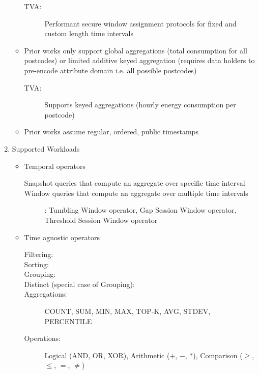 \documentclass{article}
\begin{document}
\begin{enumerate}
\begin{itemize}
        \begin{description}
            \item[TVA:] Performant secure window assignment protocols for fixed and custom length time intervals
        \end{description}
       \item Prior works only support global aggregations (total consumption for all postcodes) or limited additive keyed aggregation (requires data holders to pre-encode attribute domain i.e. all possible postcodes)
         \begin{description}
            \item[TVA:] Supports keyed aggregations (hourly energy consumption per postcode)
        \end{description}
       \item Prior works assume regular, ordered, public timestamps
    \end{itemize}
    \item Supported Workloads
    \begin{itemize}
       \item Temporal operators 
        \begin{description}
            \item[Snapshot queries that compute an aggregate over specific time interval]
            \item[Window queries that compute an aggregate over multiple time intervals]: Tumbling Window operator, Gap Session Window operator, Threshold Session Window operator
        \end{description}
       \item Time agnostic operators 
         \begin{description}
            \item[Filtering:] 
            \item[Sorting:] 
            \item[Grouping:] 
            \item[Distinct (special case of Grouping):] 
            \item[Aggregations:] COUNT, SUM, MIN, MAX, TOP-K, AVG, STDEV, PERCENTILE
            \item[Operations:] Logical (AND, OR, XOR), Arithmetic ($+$, $-$, $*$), Comparison ($\ge$, $\le$, $=$, $\neq$)
        \end{description}
    \end{itemize}
\end{enumerate}
\end{document}
